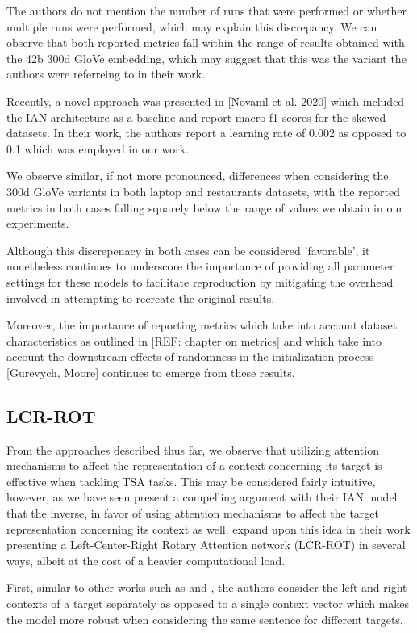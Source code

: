 \documentclass[../../fyp.tex]{subfiles}
\begin{document}
The authors do not mention the number of runs that were performed or whether multiple runs were performed, which may explain this discrepancy. We can observe that both reported metrics fall within the range of results obtained with the 42b 300d GloVe embedding, which may suggest that this was the variant the authors were referreing to in their work. 

Recently, a novel approach was presented in [Novanil et al. 2020] which included the IAN architecture as a baseline and report macro-f1 scores for the skewed datasets. In their work, the authors report a learning rate of 0.002 as opposed to 0.1 which was employed in our work. 

We observe similar, if not more pronounced, differences when considering the 300d GloVe variants in both laptop and restaurants datasets, with the reported metrics in both cases falling squarely below the range of values we obtain in our experiments. 

Although this discrepenacy in both cases can be considered 'favorable', it nonetheless continues to underscore the importance of providing all parameter settings for these models to facilitate reproduction by mitigating the overhead involved in attempting to recreate the original results. 

Moreover, the importance of reporting metrics which take into account dataset characteristics as outlined in [REF: chapter on metrics] and which take into account the downstream effects of randomness in the initialization process [Gurevych, Moore] continues to emerge from these results. 

\subsection{LCR-ROT}
From the approaches described thus far, we observe that utilizing attention mechanisms to affect the representation of a context concerning its target is effective when tackling TSA tasks. This may be considered fairly intuitive, however, as we have seen \cite{dehongma2017} present a compelling argument with their IAN model that the inverse, in favor of using attention mechanisms to affect the target representation concerning its context as well. \cite{zheng2018} expand upon this idea in their work presenting a Left-Center-Right Rotary Attention network (LCR-ROT) in several ways, albeit at the cost of a heavier computational load. 

First, similar to other works such as \cite{tang2016} and \cite{chen2017}, the authors consider the left and right contexts of a target separately as opposed to a single context vector which makes the model more robust when considering the same sentence for different targets. 
\end{document}
